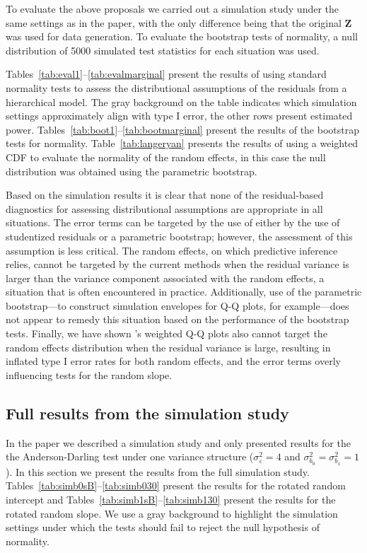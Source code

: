 \documentclass[12pt]{article} %
\begin{document}
To evaluate the above proposals we carried out a simulation study under the same settings as in the paper, with the only difference being that the original $\bm{Z}$ was used for data generation. To evaluate the bootstrap tests of normality, a null distribution of 5000 simulated test statistics for each situation was used.

Tables~\ref{tab:eval1}--\ref{tab:evalmarginal} present the results of using standard normality tests to assess the distributional assumptions of the residuals from a hierarchical model. The gray background on the table indicates which simulation settings approximately align with type I error, the other rows present estimated power. Tables~\ref{tab:boot1}--\ref{tab:bootmarginal} present the results of the bootstrap tests for normality. Table~\ref{tab:langeryan} presents the results of using a weighted CDF to evaluate the normality of the random effects, in this case the null distribution was obtained using the parametric bootstrap.

Based on the simulation results it is clear that none of the residual-based diagnostics for assessing distributional assumptions are appropriate in all situations. The error terms can be targeted by the use of either by the use of studentized residuals or a parametric bootstrap; however, the assessment of this assumption is less critical. The random effects, on which predictive inference relies, cannot be targeted by the current methods when the residual variance is larger than the variance component associated with the random effects, a situation that is often encountered in practice. Additionally, use of the parametric bootstrap---to construct simulation envelopes for Q-Q plots, for example---does not appear to remedy this situation based on the performance of the bootstrap tests. Finally, we have shown \citeauthor{Lange:1989uu}'s weighted Q-Q plots also cannot target the random effects distribution when the residual variance is large, resulting in inflated type I error rates for both random effects, and the error terms overly influencing tests for the random slope.





\subsection{Full results from the simulation study}\label{supp:simstudy}

In the paper we described a simulation study and only presented results for the the Anderson-Darling test under one variance structure ($\sigma^2_\varepsilon = 4$ and $\sigma^2_{b_0} = \sigma^2_{b_1} = 1$). In this section we present the results from the full simulation study. Tables~\ref{tab:simb0sB}--\ref{tab:simb030} present the results for the rotated random intercept and Tables~\ref{tab:simb1sB}--\ref{tab:simb130} present the results for the rotated random slope. We use a gray background to highlight the simulation settings under which the tests should fail to reject the null hypothesis of normality.
\end{document}
